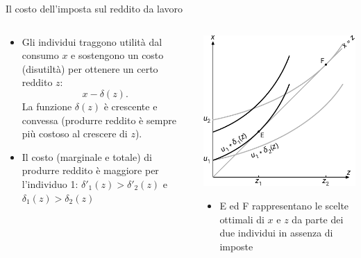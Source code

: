 \documentclass[aspectratio=64,11pt]{beamer}
\begin{document}
\begin{frame}{Il costo dell'imposta sul reddito da lavoro}
\begin{columns}
\begin{column}{.45\columnwidth}
\begin{itemize}
\item Gli individui traggono utilità dal consumo $x$ e sostengono un costo
(disutiltà) per ottenere un certo reddito $z$: $$x-\delta(z).$$ La funzione
$\delta(z)$ è crescente e convessa (produrre reddito è sempre più costoso al
crescere di $z$).
\item Il costo (marginale e totale) di produrre reddito è maggiore per l'individuo
1: $\delta'_1(z)> \delta'_2(z)$ e $\delta_1(z)>\delta_2(z)$
\end{itemize}
\end{column}

\begin{column}{.45\columnwidth}
\begin{center}
\includegraphics[scale=.7]{./figure/effetto-distorsivo-imposte-ql-1.pdf}
\end{center}

\small
\begin{itemize}
\item E ed F rappresentano le scelte ottimali di $x$ e $z$ da parte dei due
individui in assenza di imposte
\end{itemize}
\end{column}
\end{columns}
\end{frame}
\end{document}

